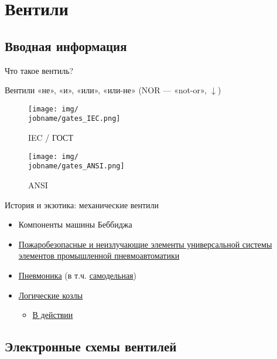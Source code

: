 \documentclass[xetex,aspectratio=43]{beamer}
\begin{document}
\section{Вентили}

\subsection{Вводная информация}

\begin{frame}{Что такое вентиль?}

\pause

Вентили «не», «и», «или», «или-не» (NOR --- «not-or», \(\downarrow\))

\begin{figure}
    \texttt{[image: img/\\jobname/gates\_IEC.png]}
    \caption{IEC / ГОСТ}
\end{figure}


\begin{figure}
    \texttt{[image: img/\\jobname/gates\_ANSI.png]}
    \caption{ANSI}
\end{figure}

\end{frame}

\begin{frame}{История и экзотика: механические вентили}
\begin{itemize}
\item
  Компоненты машины Беббиджа
\item
  \href{http://bse.sci-lib.com/particle017859.html}{Пожаробезопасные и
  неизлучающие элементы универсальной системы элементов промышленной
  пневмоавтоматики}
\item
  \href{https://habr.com/ru/company/ruvds/blog/695210/}{Пневмоника} (в т.ч. \href{https://youtu.be/yvANcR4mQ7M}{самодельная})
\item
  \href{http://www.robives.com/category/product_tags/logic_goats}{Логические
  козлы}

  \begin{itemize}
  \item
    \href{https://youtu.be/vu3o6JNclRQ}{В действии}
  \end{itemize}
\end{itemize}
\end{frame}

\subsection{Электронные схемы вентилей}
\end{document}
